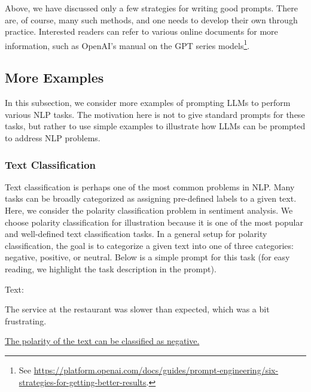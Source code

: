 Above, we have discussed only a few strategies for writing good prompts. There are, of course, many such methods, and one needs to develop their own through practice. Interested readers can refer to various online documents for more information, such as OpenAI's manual on the GPT series models\footnote{See \url{https://platform.openai.com/docs/guides/prompt-engineering/six-strategies-for-getting-better-results}.}.

\subsection{More Examples}

\noindent In this subsection, we consider more examples of prompting LLMs to perform various NLP tasks. The motivation here is not to give standard prompts for these tasks, but rather to use simple examples to illustrate how LLMs can be prompted to address NLP problems.

\subsubsection{Text Classification}

\noindent Text classification is perhaps one of the most common problems in NLP. Many tasks can be broadly categorized as assigning pre-defined labels to a given text. Here, we consider the polarity classification problem in sentiment analysis. We choose polarity classification for illustration because it is one of the most popular and well-defined text classification tasks. In a general setup for polarity classification, the goal is to categorize a given text into one of three categories: negative, positive, or neutral. Below is a simple prompt for this task (for easy reading, we highlight the task description in the prompt).

\vspace{0.5em}
\begin{tcolorbox}

\begingroup
\setlength{\leftskip}{2em}
\setlength{\rightskip}{2em}


\vspace{0.7em}

Text:

The service at the restaurant was slower than expected, which was a bit frustrating.

\vspace{0.7em}

\underline{The polarity of the text can be classified as negative.}

\endgroup

\end{tcolorbox}
\vspace{0.5em}

